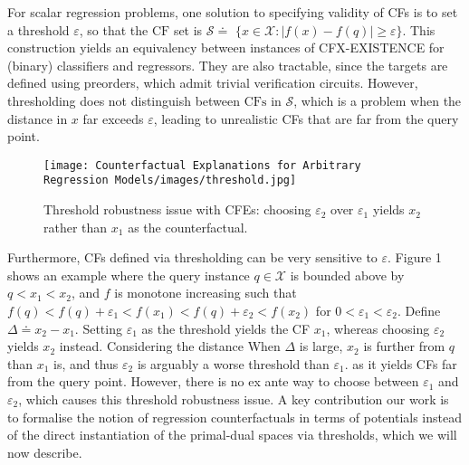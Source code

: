 
For scalar regression problems, one solution to specifying validity of CFs is to set a threshold $\varepsilon$, so that the $\mathrm{CF}$ set is $\mathcal{S} \doteq$ $\{x \in \mathcal{X}:|f(x)-f(q)| \geq \varepsilon\}$. This construction yields an equivalency between instances of CFX-EXISTENCE for (binary) classifiers and regressors. They are also tractable, since the targets are defined using preorders, which admit trivial verification circuits. However, thresholding does not distinguish between $\mathrm{CFs}$ in $\mathcal{S}$, which is a problem when the distance in $x$ far exceeds $\varepsilon$, leading to unrealistic CFs that are far from the query point.

\begin{figure}[h]
    \centering
    \texttt{[image: Counterfactual Explanations for Arbitrary Regression Models/images/threshold.jpg]}
    \caption{Threshold robustness issue with CFEs: choosing $\varepsilon_{2}$ over $\varepsilon_{1}$ yields $x_{2}$ rather than $x_{1}$ as the counterfactual.}
\end{figure}

 Furthermore, CFs defined via thresholding can be very sensitive to $\varepsilon$. Figure 1 shows an example where the query instance $q \in \mathcal{X}$ is bounded above by $q<x_{1}<x_{2}$, and $f$ is monotone increasing such that $f(q)<f(q)+\varepsilon_{1}<f\left(x_{1}\right)<f(q)+\varepsilon_{2}<f\left(x_{2}\right)$ for $0<\varepsilon_{1}<\varepsilon_{2}$. Define $\Delta \doteq x_{2}-x_{1}$. Setting $\varepsilon_{1}$ as the threshold yields the CF $x_{1}$, whereas choosing $\varepsilon_{2}$ yields $x_{2}$ instead. Considering the distance When $\Delta$ is large, $x_{2}$ is further from $q$ than $x_{1}$ is, and thus $\varepsilon_{2}$ is arguably a worse threshold than $\varepsilon_{1}$. as it yields CFs far from the query point. However, there is no ex ante way to choose between $\varepsilon_{1}$ and $\varepsilon_{2}$, which causes this threshold robustness issue. A key contribution our work is to formalise the notion of regression counterfactuals in terms of potentials instead of the direct instantiation of the primal-dual spaces via thresholds, which we will now describe.


